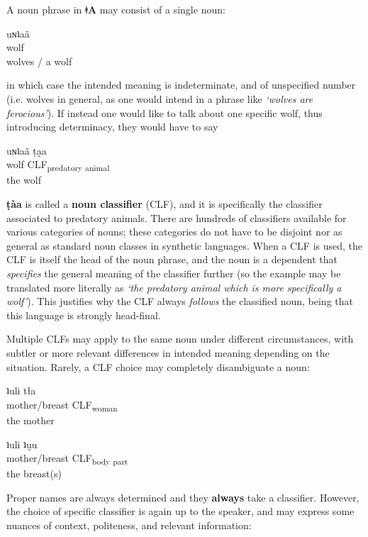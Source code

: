 \documentclass[11pt,a5paper]{book}
\newcommand{\qcn}[1]{\textcolor{AccentText}{\large\textbf{#1}}}
\newcommand{\langname}{\qcn{ǂA}}
\newcommand{\grammsc}[1]{\textsc{#1}}
\newcommand{\CLF}[1]{\grammsc{CLF}\textsubscript{#1}}
\begin{document}
A noun phrase in \langname{} may consist of a single noun:

\begin{exe}
\ex
\gll uɴʇaã\\
wolf\\
\glt wolves / a wolf
\end{exe}

in which case the intended meaning is indeterminate, and of unspecified number (i.e. wolves in general, as one would intend in a phrase like \emph{`wolves are ferocious'}). If instead one would like to talk about one specific wolf, thus introducing determinacy, they would have to say

\begin{exe}
\ex
\gll uɴʇaã ṭa̰a\\
wolf \CLF{predatory animal}\\
\glt the wolf
\end{exe}

\qcn{ṭàa} is called a \textbf{noun classifier} (CLF), and it is specifically the classifier associated to predatory animals. There are hundreds of classifiers available for various categories of nouns; these categories do not have to be disjoint nor as general as standard noun classes in synthetic languages. When a CLF is used, the CLF is itself the head of the noun phrase, and the noun is a dependent that \emph{specifies} the general meaning of the classifier further (so the example may be translated more literally as \emph{`the predatory animal which is more specifically a wolf'}). This justifies why the CLF always \emph{follows} the classified noun, being that this language is strongly head-final.

Multiple CLFs may apply to the same noun under different circumstances, with subtler or more relevant differences in intended meaning depending on the situation. Rarely, a CLF choice may completely disambiguate a noun:

\begin{exe}
\ex
\gll ʇuli tła\\
mother/breast \CLF{woman}\\
\glt the mother
\end{exe}

\begin{exe}
\ex
\gll ʇuli ʇṵu\\
mother/breast \CLF{body part}\\
\glt the breast(s)
\end{exe}

Proper names are always determined and they \textbf{always} take a classifier. However, the choice of specific classifier is again up to the speaker, and may express some nuances of context, politeness, and relevant information:
\end{document}
